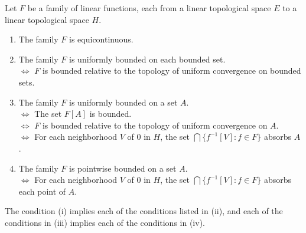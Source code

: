 Let $F$ be a family of linear functions, each from a linear topological space $E$ to a linear topological space $H$.

\begin{enumerate}
\item[(i)] The family $F$ is equicontinuous.
\item[(ii)] The family $F$ is uniformly bounded on each bounded set. \\
$\Leftrightarrow$ $F$ is bounded relative to the topology of uniform convergence on bounded sets.
\item[(iii)] The family $F$ is uniformly bounded on a set $A$. \\
$\Leftrightarrow$ The set $F[A]$ is bounded. \\
$\Leftrightarrow$ $F$ is bounded relative to the topology of uniform convergence on $A$. \\
$\Leftrightarrow$ For each neighborhood $V$ of $0$ in $H$, the set $\bigcap\{f^{-1}[V] : f \in F\}$ absorbs $A$.
\item[(iv)] The family $F$ is pointwise bounded on a set $A$. \\
$\Leftrightarrow$ For each neighborhood $V$ of $0$ in $H$, the set $\bigcap\{f^{-1}[V] : f \in F\}$ absorbs each point of $A$.
\end{enumerate}

The condition (i) implies each of the conditions listed in (ii), and each of the conditions in (iii) implies each of the conditions in (iv).
